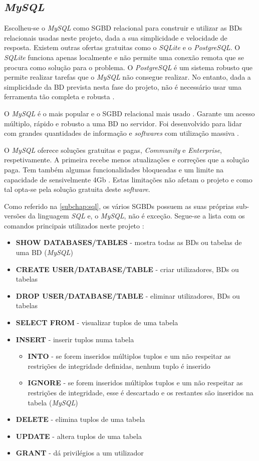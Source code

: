 \documentclass[11pt,twoside,a4paper]{report}
\begin{document}
\subsection{\textit{MySQL}}
\label{subchap:mysql}
Escolheu-se o \textit{MySQL} como SGBD relacional para construir e utilizar as BDs relacionais usadas neste projeto, dada a sua simplicidade e velocidade de resposta. Existem outras ofertas gratuitas como o \textit{SQLite} e o \textit{PostgreSQL}. O \textit{SQLite} funciona apenas localmente e não permite uma conexão remota que se procura como solução para o problema. O \textit{PostgreSQL} é um sistema robusto que permite realizar tarefas que o \textit{MySQL} não consegue realizar. No entanto, dada a simplicidade da BD prevista nesta fase do projeto, não é necessário usar uma ferramenta tão completa e robusta \cite{mysqlvs}.\par 
O \textit{MySQL} é o mais popular e o SGBD relacional mais usado \cite{mysqlvs}. Garante um acesso múltiplo, rápido e robusto a uma BD no servidor. Foi desenvolvido para lidar com grandes quantidades de informação e \textit{softwares} com utilização massiva \cite{mysql}.\par 
O \textit{MySQL} oferece soluções gratuitas e pagas, \textit{Community} e \textit{Enterprise}, respetivamente. A primeira recebe menos atualizações e correções que a solução paga. Tem também algumas funcionalidades bloqueadas e um limite na capacidade de sensivelmente 4Gb \cite{mysql}. Estas limitações não afetam o projeto e como tal opta-se pela solução gratuita deste \textit{software}.\par
Como referido na \autoref{subchap:sql}, os vários SGBDs possuem as suas próprias sub-versões da linguagem \textit{SQL} e, o \textit{MySQL}, não é exceção. Segue-se a lista com os comandos principais utilizados neste projeto \cite{mysql}:
\begin{itemize}
	\item \textbf{SHOW DATABASES/TABLES} - mostra todas as BDs ou tabelas de uma BD (\textit{MySQL})
	\item \textbf{CREATE USER/DATABASE/TABLE} - criar utilizadores, BDs ou tabelas
	\item \textbf{DROP USER/DATABASE/TABLE} - eliminar utilizadores, BDs ou tabelas
	\item \textbf{SELECT FROM} - visualizar tuplos de uma tabela
	\item \textbf{INSERT} - inserir tuplos numa tabela
	\begin{itemize}
		\item \textbf{INTO} - se forem inseridos múltiplos tuplos e um não respeitar as restrições de integridade definidas, nenhum tuplo é inserido
		\item \textbf{IGNORE} - se forem inseridos múltiplos tuplos e um não respeitar as restrições de integridade, esse é descartado e os restantes são inseridos na tabela (\textit{MySQL})
	\end{itemize}
	\item \textbf{DELETE} - elimina tuplos de uma tabela
	\item \textbf{UPDATE} - altera tuplos de uma tabela
	\item \textbf{GRANT} - dá privilégios a um utilizador
\end{itemize}
\end{document}
